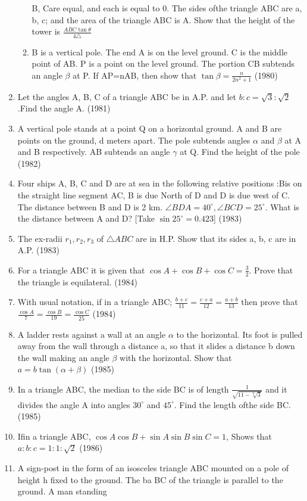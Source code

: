 \documentclass[12pt]{article}
\begin{document}
\begin{enumerate}
\begin{enumerate}
B, Care equal, and each is equal to 0. The sides ofthe triangle ABC are a, b, c; and the area of the triangle ABC is A. Show that the height of the tower is $\frac{ABC\tan \theta}{4\triangle}$
\item B is a vertical pole. The end A is on the level ground. C is the middle point of AB. P is a point on the level ground. The portion CB subtends an angle $\beta$ at P. If AP=nAB, then show that $\tan\beta=\frac{n}{2n^2+1}$ (1980)
\end{enumerate}
\item Let the angles A, B, C of a triangle ABC be in A.P. and let $b:c=\sqrt{3}:\sqrt{2}$.Find the angle A. (1981)
\item A vertical pole stands at a point Q on a horizontal ground. A and B are points on the ground, d meters apart. The pole subtends angles $\alpha$ and $\beta$ at A and B respectively. AB subtends an angle $\gamma$ at Q. Find the height of the pole (1982)
\item Four ships A, B, C and D are at sea in the following relative positions :Bis on the straight line segment AC, B is due North of D and D is due west of C. The distance between B and D is 2 km. $\angle BDA=40^\circ,\angle BCD=25^\circ$. What is the distance between A and D? [Take $\sin 25^\circ=0.423$] (1983)
\item The ex-radii $r_1,r_2,r_3$ of $\triangle ABC$ are in H.P. Show that its sides a, b, c are in A.P. (1983)
\item For a triangle ABC it is given that $\cos A+\cos B+\cos C=\frac{3}{2}$. Prove that the triangle is equilateral. (1984)
\item With usual notation, if in a triangle ABC; $\frac{b+c}{11}=\frac{c+a}{12}=\frac{a+b}{13}$ then prove that $\frac{\cos A}{7}=\frac{\cos B}{19}=\frac{\cos C}{25}$ (1984)
\item A ladder rests against a wall at an angle $\alpha$ to the horizontal. Its foot is pulled away from the wall through a distance a, so that it slides a distance b down the wall making an angle $\beta$ with the horizontal. Show that $a=b\tan(\alpha+\beta)$ (1985)
\item In a triangle ABC, the median to the side BC is of length $\frac{1}{\sqrt{11-\sqrt[6]{3}}}$ and it divides the angle A into angles $30^\circ$ and $45^\circ$. Find the length ofthe side BC. (1985)
\item Ifin a triangle ABC, $\cos A\cos B+\sin A\sin B \sin C=1$, Shows that $a:b:c=1:1:\sqrt{2}$ (1986)
\item A sign-post in the form of an isosceles triangle ABC mounted on a pole of height h fixed to the ground. The ba BC of the triangle is parallel to the ground. A man standing

\end{enumerate}
\end{document}
